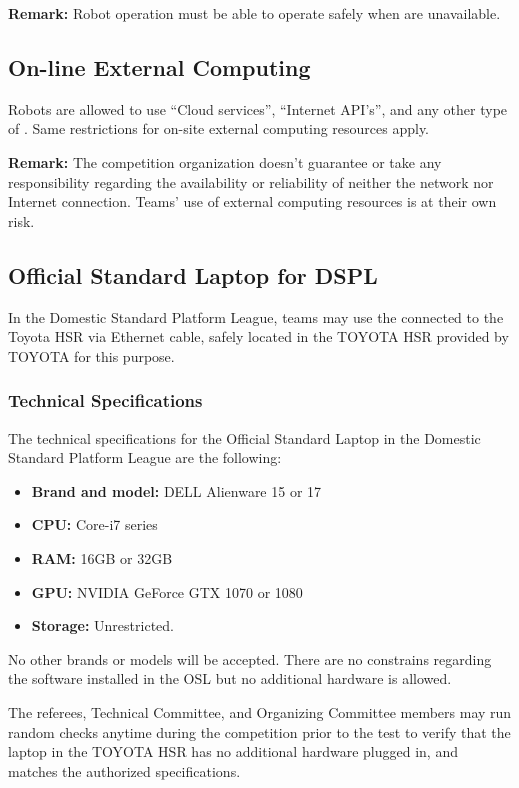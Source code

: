 \noindent \textbf{Remark:} Robot operation must be able to operate safely when  are unavailable.



\subsection{On-line External Computing}
\label{rule:robot_external_computing_online}
Robots are allowed to use \enquote{Cloud services}, \enquote{Internet API's}, and any other type of .
Same restrictions for on-site external computing resources apply.

\noindent \textbf{Remark:} The competition organization doesn't guarantee or take any responsibility regarding the availability or reliability of neither the network nor Internet connection.
Teams' use of external computing resources is at their own risk.



\subsection{Official Standard Laptop for DSPL}
\label{rule:osl_dspl}

In the Domestic Standard Platform League, teams may use the  connected to the Toyota HSR via Ethernet cable, safely located in the TOYOTA HSR  provided by TOYOTA for this purpose.

\subsubsection{Technical Specifications}
The technical specifications for the Official Standard Laptop in the Domestic Standard Platform League are the following:


 \begin{itemize}
  \item \textbf{Brand and model:} DELL Alienware 15 or 17
  \item \textbf{CPU:} Core-i7 series
  \item \textbf{RAM:} 16GB or 32GB
  \item \textbf{GPU:} NVIDIA GeForce GTX 1070 or 1080
  \item \textbf{Storage:} Unrestricted.
\end{itemize}

No other brands or models will be accepted. There are no constrains regarding the software installed in the OSL but no additional hardware is allowed.

The referees, Technical Committee, and Organizing Committee members may run random checks anytime during the competition prior to the test to verify that the laptop in the TOYOTA HSR  has no additional hardware plugged in, and matches the authorized specifications.


